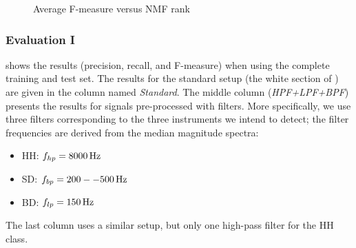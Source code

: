 \documentclass{article}
\begin{document}
\begin{figure}
 \centerline{}
 \caption{Average F-measure versus NMF rank}%
 \label{fig:rankTest}
\end{figure}

\subsubsection{Evaluation I}
 shows the results (precision, recall, and F-measure) when using the complete training and test set. 
The results for the standard setup (the white section of ) are given in the column named \textit{Standard}. The middle column (\textit{HPF+LPF+BPF}) presents the results for signals pre-processed with filters. More specifically, we use three filters corresponding to the three instruments we intend to detect; the filter frequencies are derived from the median magnitude spectra: 
\begin{itemize}
    \item   HH: $f_{hp} = \unit[8000]{Hz}$
    \item   SD: $f_{bp} = \unit[200--500]{Hz}$
    \item   BD: $f_{lp} = \unit[150]{Hz}$
\end{itemize}
The last column uses a similar setup, but only one high-pass filter for the HH class.
\end{document}
